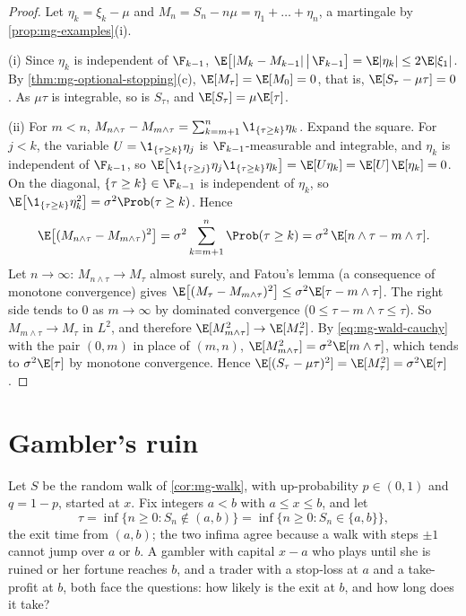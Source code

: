 \begin{proof}
Let $\eta_k=\xi_k-\mu$ and $M_n=S_n-n\mu=\eta_1+\dots+\eta_n$, a martingale by
\cref{prop:mg-examples}(i).

(i) Since $\eta_k$ is independent of $\F_{k-1}$,
$\E\big[|M_k-M_{k-1}|\,\big|\,\F_{k-1}\big]=\E|\eta_k|\le2\E|\xi_1|$. By
\cref{thm:mg-optional-stopping}(c), $\E[M_\tau]=\E[M_0]=0$, that is,
$\E[S_\tau-\mu\tau]=0$. As $\mu\tau$ is integrable, so is $S_\tau$, and
$\E[S_\tau]=\mu\E[\tau]$.

(ii) For $m<n$, $M_{n\wedge\tau}-M_{m\wedge\tau}=\sum_{k=m+1}^{n}\1_{\{\tau\ge k\}}\eta_k$.
Expand the square. For $j<k$, the variable $U=\1_{\{\tau\ge k\}}\eta_j$ is
$\F_{k-1}$-measurable and integrable, and $\eta_k$ is independent of $\F_{k-1}$, so
$\E\big[\1_{\{\tau\ge j\}}\eta_j\1_{\{\tau\ge k\}}\eta_k\big]=\E[U\eta_k]=\E[U]\,\E[\eta_k]=0$. On
the diagonal, $\{\tau\ge k\}\in\F_{k-1}$ is independent of $\eta_k$, so
$\E\big[\1_{\{\tau\ge k\}}\eta_k^2\big]=\sigma^2\Prob(\tau\ge k)$. Hence
\begin{equation}\label{eq:mg-wald-cauchy}
  \E\big[(M_{n\wedge\tau}-M_{m\wedge\tau})^2\big]=\sigma^2\sum_{k=m+1}^{n}\Prob(\tau\ge k)=\sigma^2\,\E[n\wedge\tau-m\wedge\tau].
\end{equation}
Let $n\to\infty$: $M_{n\wedge\tau}\to M_\tau$ almost surely, and Fatou's lemma (a consequence
of monotone convergence) gives $\E\big[(M_\tau-M_{m\wedge\tau})^2\big]\le\sigma^2\E[\tau-m\wedge\tau]$.
The right side tends to $0$ as $m\to\infty$ by dominated convergence ($0\le\tau-m\wedge\tau\le\tau$).
So $M_{m\wedge\tau}\to M_\tau$ in $L^2$, and therefore $\E[M_{m\wedge\tau}^2]\to\E[M_\tau^2]$. By
\eqref{eq:mg-wald-cauchy} with the pair $(0,m)$ in place of $(m,n)$,
$\E[M_{m\wedge\tau}^2]=\sigma^2\E[m\wedge\tau]$, which tends to $\sigma^2\E[\tau]$ by monotone
convergence. Hence $\E[(S_\tau-\mu\tau)^2]=\E[M_\tau^2]=\sigma^2\E[\tau]$.
\end{proof}

\section{Gambler's ruin}\label{sec:mg-ruin}

Let $S$ be the random walk of \cref{cor:mg-walk}, with up-probability $p\in(0,1)$ and
$q=1-p$, started at $x$. Fix integers $a<b$ with $a\le x\le b$, and let
\[
  \tau=\inf\{n\ge0:S_n\notin(a,b)\}=\inf\{n\ge0:S_n\in\{a,b\}\},
\]
the exit time from $(a,b)$; the two infima agree because a walk with steps $\pm1$ cannot jump
over $a$ or $b$. A gambler with capital $x-a$ who plays until she is ruined or her fortune
reaches $b$, and a trader with a stop-loss at $a$ and a take-profit at $b$, both face the
questions: how likely is the exit at $b$, and how long does it take?

